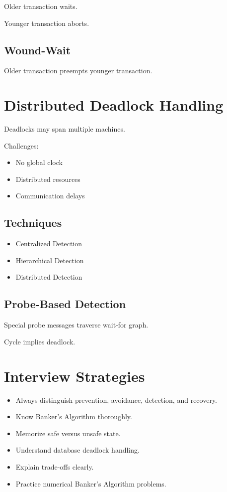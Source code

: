 Older transaction waits.

Younger transaction aborts.

\subsection{Wound-Wait}

Older transaction preempts younger transaction.

\section{Distributed Deadlock Handling}

Deadlocks may span multiple machines.

Challenges:

\begin{itemize}
\item No global clock
\item Distributed resources
\item Communication delays
\end{itemize}

\subsection{Techniques}

\begin{itemize}
\item Centralized Detection
\item Hierarchical Detection
\item Distributed Detection
\end{itemize}

\subsection{Probe-Based Detection}

Special probe messages traverse wait-for graph.

Cycle implies deadlock.

\section{Interview Strategies}

\begin{itemize}
\item Always distinguish prevention, avoidance, detection, and recovery.
\item Know Banker's Algorithm thoroughly.
\item Memorize safe versus unsafe state.
\item Understand database deadlock handling.
\item Explain trade-offs clearly.
\item Practice numerical Banker's Algorithm problems.
\end{itemize}

